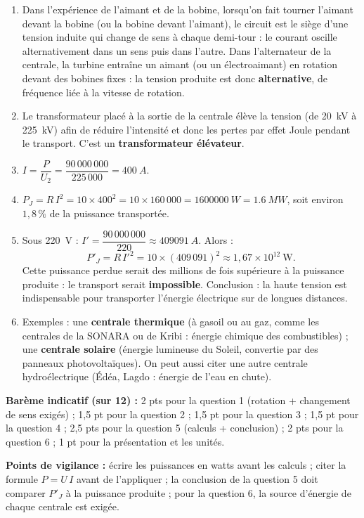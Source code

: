\documentclass[11pt]{article}
\begin{document}
\begin{corrige}
\begin{enumerate}
\item Dans l'expérience de l'aimant et de la bobine, lorsqu'on fait tourner l'aimant devant la bobine (ou la bobine devant l'aimant), le circuit est le siège d'une tension induite qui change de sens à chaque demi-tour : le courant oscille alternativement dans un sens puis dans l'autre. Dans l'alternateur de la centrale, la turbine entraîne un aimant (ou un électroaimant) en rotation devant des bobines fixes : la tension produite est donc \textbf{alternative}, de fréquence liée à la vitesse de rotation.
\item Le transformateur placé à la sortie de la centrale élève la tension (de \SI{20}{kV} à \SI{225}{kV}) afin de réduire l'intensité et donc les pertes par effet Joule pendant le transport. C'est un \textbf{transformateur élévateur}.
\item $I = \dfrac{P}{U_2} = \dfrac{90\,000\,000}{225\,000} = \SI{400}{A}$.
\item $P_J = R\,I^2 = 10 \times 400^2 = 10 \times 160\,000 = \SI{1600000}{W} = \SI{1,6}{MW}$, soit environ $1{,}8\,\%$ de la puissance transportée.
\item Sous \SI{220}{V} : $I' = \dfrac{90\,000\,000}{220} \approx \SI{409091}{A}$. Alors :
\[ P'_J = R\,I'^2 = 10 \times (409\,091)^2 \approx 1{,}67 \times 10^{12}\ \text{W}. \]
Cette puissance perdue serait des millions de fois supérieure à la puissance produite : le transport serait \textbf{impossible}. Conclusion : la haute tension est indispensable pour transporter l'énergie électrique sur de longues distances.
\item Exemples : une \textbf{centrale thermique} (à gasoil ou au gaz, comme les centrales de la SONARA ou de Kribi : énergie chimique des combustibles) ; une \textbf{centrale solaire} (énergie lumineuse du Soleil, convertie par des panneaux photovoltaïques). On peut aussi citer une autre centrale hydroélectrique (Édéa, Lagdo : énergie de l'eau en chute).
\end{enumerate}
\textbf{Barème indicatif (sur 12) :} 2 pts pour la question 1 (rotation + changement de sens exigés) ; 1,5 pt pour la question 2 ; 1,5 pt pour la question 3 ; 1,5 pt pour la question 4 ; 2,5 pts pour la question 5 (calculs + conclusion) ; 2 pts pour la question 6 ; 1 pt pour la présentation et les unités.

\textbf{Points de vigilance :} écrire les puissances en watts avant les calculs ; citer la formule $P = U\,I$ avant de l'appliquer ; la conclusion de la question 5 doit comparer $P'_J$ à la puissance produite ; pour la question 6, la source d'énergie de chaque centrale est exigée.
\end{corrige}
\end{document}
